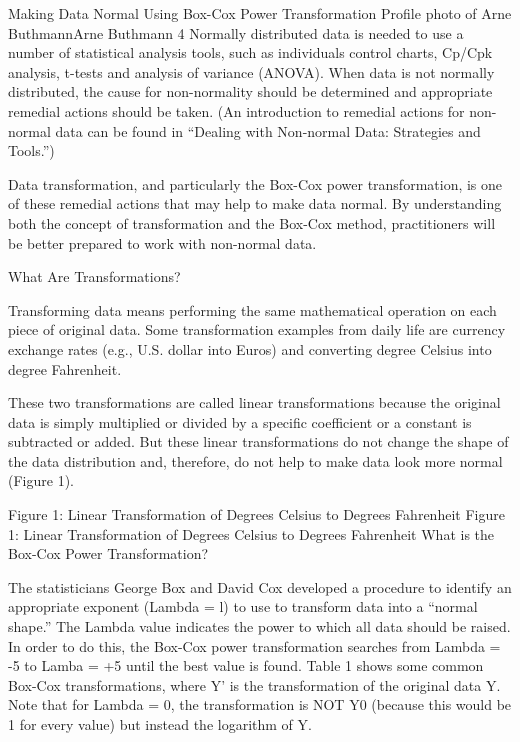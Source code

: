 
Making Data Normal Using Box-Cox Power Transformation
 Profile photo of Arne ButhmannArne Buthmann 4
Normally distributed data is needed to use a number of statistical analysis tools, such as individuals control charts, Cp/Cpk analysis, t-tests and analysis of variance (ANOVA). When data is not normally distributed, the cause for non-normality should be determined and appropriate remedial actions should be taken. (An introduction to remedial actions for non-normal data can be found in “Dealing with Non-normal Data: Strategies and Tools.”) 

Data transformation, and particularly the Box-Cox power transformation, is one of these remedial actions that may help to make data normal. By understanding both the concept of transformation and the Box-Cox method, practitioners will be better prepared to work with non-normal data. 

What Are Transformations?

Transforming data means performing the same mathematical operation on each piece of original data. Some transformation examples from daily life are currency exchange rates (e.g., U.S. dollar into Euros) and converting degree Celsius into degree Fahrenheit. 

These two transformations are called linear transformations because the original data is simply multiplied or divided by a specific coefficient or a constant is subtracted or added. But these linear transformations do not change the shape of the data distribution and, therefore, do not help to make data look more normal (Figure 1).

Figure 1: Linear Transformation of Degrees Celsius to Degrees Fahrenheit
Figure 1: Linear Transformation of Degrees Celsius to Degrees Fahrenheit
What is the Box-Cox Power Transformation?

The statisticians George Box and David Cox developed a procedure to identify an appropriate exponent (Lambda = l) to use to transform data into a “normal shape.” The Lambda value indicates the power to which all data should be raised. In order to do this, the Box-Cox power transformation searches from Lambda = -5 to Lamba = +5 until the best value is found. Table 1 shows some common Box-Cox transformations, where Y’ is the transformation of the original data Y. Note that for Lambda = 0, the transformation is NOT Y0 (because this would be 1 for every value) but instead the logarithm of Y. 

